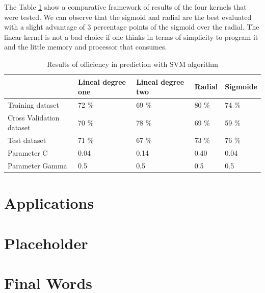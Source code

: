 \documentclass[]{book}
\begin{document}
The Table \ref{tab:results-of-efficiency-svm} show a comparative
framework of results of the four kernels that were tested. We can
observe that the sigmoid and radial are the best evaluated with a slight
advantage of 3 percentage points of the sigmoid over the radial. The
linear kernel is not a bad choice if one thinks in terms of simplicity
to program it and the little memory and processor that consumes.

\begin{table}[ht]
\centering
\caption{Results of officiency in prediction with SVM algorithm}
\label{tab:results-of-efficiency-svm}
\begin{tabular}{lllll}
\hline
                         & Lineal degree one & Lineal degree two & Radial & Sigmoide \\ \hline
Training dataset         & 72 \%             & 69 \%             & 80 \%  & 74 \%    \\
Cross Validation dataset & 70 \%             & 78 \%             & 69 \%  & 59 \%    \\
Test dataset             & 71 \%             & 67 \%             & 73 \%  & 76 \%    \\
Parameter C              & 0.04              & 0.14              & 0.40   & 0.04     \\
Parameter Gamma          & 0.5               & 0.5               & 0.5    & 0.5      \\ \hline
\end{tabular}
\end{table}

\chapter{Applications}\label{applications}

\chapter{Placeholder}\label{placeholder}

\chapter{Final Words}\label{final-words}


\end{document}
